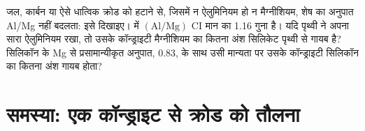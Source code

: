 \begin{exercise}[$\star\star\star$]\label{exo:b2:elements-in-the-earth:12}
जल, कार्बन या ऐसे धात्विक क्रोड को हटाने से, जिसमें न ऐलुमिनियम हो न
मैग्नीशियम, शेष का अनुपात Al/Mg नहीं बदलता: इसे दिखाइए।  में $(\mathrm{Al}/\mathrm{Mg})$ CI मान का 1.16 गुना है। यदि
पृथ्वी ने अपना सारा ऐलुमिनियम रखा, तो उसके कॉन्ड्राइटी मैग्नीशियम का कितना अंश
सिलिकेट पृथ्वी से गायब है? सिलिकॉन के Mg से प्रसामान्यीकृत अनुपात,
0.83, के साथ उसी मान्यता पर उसके कॉन्ड्राइटी सिलिकॉन का कितना अंश
गायब होता?
\end{exercise}

\section{समस्या: एक कॉन्ड्राइट से क्रोड को तौलना}

